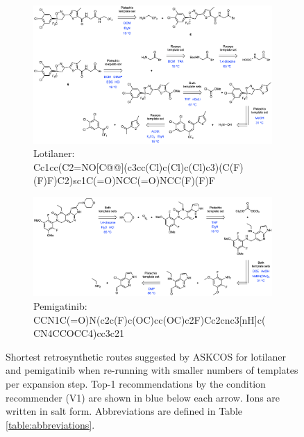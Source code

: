 \documentclass[pdflatex,sn-mathphys-num]{sn-jnl}%
\theoremstyle{thmstyleone}%
\theoremstyle{thmstyletwo}%
\theoremstyle{thmstylethree}%
\begin{document}
\begin{figure}[h!]
    \captionsetup[subfigure]{labelformat=empty}
    \begin{subfigure}[t]{1.0\textwidth}
        \includegraphics[scale=0.725]{media/SI_study/1i.lotilaner_i.png}
        \caption{Lotilaner: \\ \small Cc1cc(C2=NO[C@@](c3cc(Cl)c(Cl)c(Cl)c3)(C(F)(F)F)C2)sc1C(=O)NCC(=O)NCC(F)(F)F}
    \end{subfigure}
    \hfill
    \vspace{1cm}
    \begin{subfigure}[t]{1.0\textwidth}
        \includegraphics[scale=0.725]{media/SI_study/2i.pemigatinib_i.png}
        \caption{Pemigatinib: \\ \small CCN1C(=O)N(c2c(F)c(OC)cc(OC)c2F)Cc2cnc3[nH]c(CN4CCOCC4)cc3c21}
    \end{subfigure}
    \hfill
    \caption{Shortest retrosynthetic routes suggested by ASKCOS for lotilaner and pemigatinib when re-running with smaller numbers of templates per expansion step. Top-1 recommendations by the condition recommender (V1) are shown in blue below each arrow. Ions are written in salt form. Abbreviations are defined in Table \ref{table:abbreviations}.}
    \label{fig:fda_study_interesting_1}
\end{figure}
\end{document}

